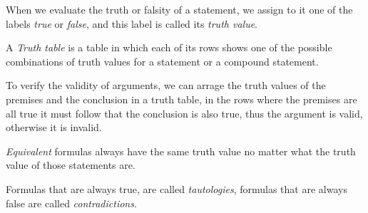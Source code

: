 When we evaluate the truth or falsity of a statement, we assign to it one of the labels \textit{true} or \textit{false}, and this label is called its \textit{truth value}.

A \textit{Truth table} is a table in which each of its rows shows one of the possible combinations of truth values for a statement or a compound statement.

To verify the validity of arguments, we can arrage the truth values of the premises and the conclusion in a truth table, in the rows where the premises are all true it must follow that the conclusion is also true, thus the argument is valid, otherwise it is invalid.

\textit{Equivalent} formulas always have the same truth value no matter what the truth value of those statements are.

Formulas that are always true, are called \textit{tautologies}, formulas that are always false are called \textit{contradictions}.